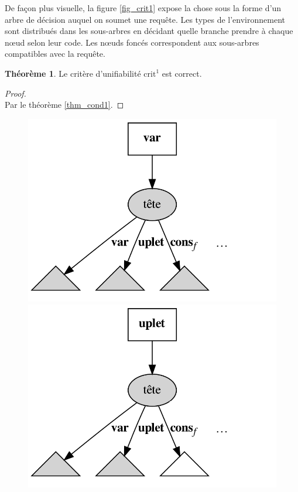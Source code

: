 \documentclass[a4paper]{report}
\newenvironment{preuve} 
  {\begin{proof}~\\} 
  {\end{proof}}
\theoremstyle{definition}
\newtheorem{theoreme}{Théorème}
\begin{document}
De façon plus visuelle, la figure \ref{fig_crit1} expose la chose sous la forme d'un arbre de décision auquel on soumet une requête. Les types de l'environnement sont distribués dans les sous-arbres en décidant quelle branche prendre à chaque nœud selon leur code. Les nœuds foncés correspondent aux sous-arbres compatibles avec la requête.

\begin{theoreme} \label{thm_crit1}
  Le critère d'unifiabilité $\mathrm{crit}^1$ est correct.
\end{theoreme}

\begin{preuve}
  Par le théorème \ref{thm_cond1}.
\end{preuve}

\begin{figure}[h]
  \begin{center}
    \includegraphics[scale=0.13]{graphs/crit1_1}
    \includegraphics[scale=0.13]{graphs/crit1_2}

\end{center}
\end{figure}
\end{document}
